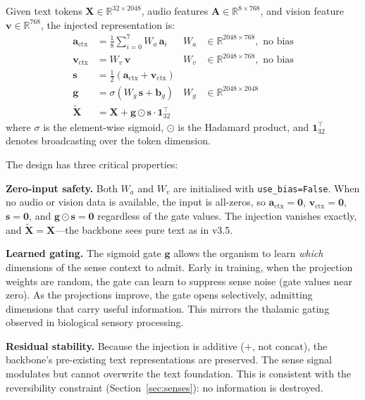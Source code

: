 \begin{definition}[SenseProjections]
Given text tokens $\mathbf{X} \in \mathbb{R}^{32 \times 2048}$, audio features $\mathbf{A} \in \mathbb{R}^{8 \times 768}$, and vision feature $\mathbf{v} \in \mathbb{R}^{768}$, the injected representation is:
\begin{align}
\mathbf{a}_{\mathrm{ctx}} &= \frac{1}{8} \sum_{i=0}^{7} W_a \, \mathbf{a}_i
    & W_a &\in \mathbb{R}^{2048 \times 768}, \text{ no bias} \label{eq:audio_proj} \\
\mathbf{v}_{\mathrm{ctx}} &= W_v \, \mathbf{v}
    & W_v &\in \mathbb{R}^{2048 \times 768}, \text{ no bias} \label{eq:vision_proj} \\
\mathbf{s} &= \tfrac{1}{2}\left(\mathbf{a}_{\mathrm{ctx}} + \mathbf{v}_{\mathrm{ctx}}\right) \label{eq:sense_ctx} \\
\mathbf{g} &= \sigma\!\left(W_g \, \mathbf{s} + \mathbf{b}_g\right)
    & W_g &\in \mathbb{R}^{2048 \times 2048} \label{eq:gate} \\
\tilde{\mathbf{X}} &= \mathbf{X} + \mathbf{g} \odot \mathbf{s} \cdot \mathbf{1}_{32}^\top \label{eq:inject}
\end{align}
where $\sigma$ is the element-wise sigmoid, $\odot$ is the Hadamard product, and $\mathbf{1}_{32}^\top$ denotes broadcasting over the token dimension.
\end{definition}

The design has three critical properties:

\textbf{Zero-input safety.}
Both $W_a$ and $W_v$ are initialised with \texttt{use\_bias=False}.
When no audio or vision data is available, the input is all-zeros, so $\mathbf{a}_{\mathrm{ctx}} = \mathbf{0}$, $\mathbf{v}_{\mathrm{ctx}} = \mathbf{0}$, $\mathbf{s} = \mathbf{0}$, and $\mathbf{g} \odot \mathbf{s} = \mathbf{0}$ regardless of the gate values.
The injection vanishes exactly, and $\tilde{\mathbf{X}} = \mathbf{X}$---the backbone sees pure text as in v3.5.

\textbf{Learned gating.}
The sigmoid gate $\mathbf{g}$ allows the organism to learn \emph{which} dimensions of the sense context to admit.
Early in training, when the projection weights are random, the gate can learn to suppress sense noise (gate values near zero).
As the projections improve, the gate opens selectively, admitting dimensions that carry useful information.
This mirrors the thalamic gating observed in biological sensory processing.

\textbf{Residual stability.}
Because the injection is additive ($+$, not $\mathrm{concat}$), the backbone's pre-existing text representations are preserved.
The sense signal modulates but cannot overwrite the text foundation.
This is consistent with the reversibility constraint (Section~\ref{sec:senses}): no information is destroyed.

